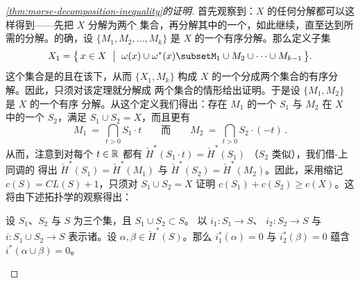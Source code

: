 \begin{proof}[\cref*{thm:morse-decomposition-inequality}的证明]
首先观察到：$X$ 的任何\trMorse{}分解都可以这样得到——先把 $X$ 分解为两个%
集合，再分解其中的一个，如此继续，直至达到所需的分解。的确，设%
$\{M_{1},M_{2},\ldots,M_{k}\}$ 是 $X$ 的一个有序\trMorse{}分解。那么定义子集
\[
X_{1}=\bigl\{\,x\in X\ \bigm|\ \omega(x)\cup\omega^{*}(x)\subset%
M_{1}\cup M_{2}\cup\cdots\cup M_{k-1}\,\bigr\}.
\]
这个集合是\trCompact{}的且在该\trFlow{}下\trInvariant，从而 $\{X_{1},M_{k}\}$%
构成 $X$ 的一个分成两个集合的有序\trMorse{}分解。因此，只须对该定理就分解成%
两个集合的情形给出证明。于是设 $\{M_{1},M_{2}\}$ 是 $X$ 的一个有序%
\trMorse{}分解。从这个定义我们得出：存在 $M_{1}$ 的一个\trCompact%
\trNeighborhood{} $S_{1}$ 与 $M_{2}$ 在 $X$ 中的一个\trCompact\trNeighborhood{}%
$S_{2}$，满足 $S_{1}\cup S_{2}=X$，而且更有
\[
M_{1}\ =\ \bigcap_{t>0}S_{1}\cdot t\qquad\text{而}\qquad M_{2}\ =\ %
\bigcap_{t>0}S_{2}\cdot(-t)\,.
\]
从而，注意到对每个 $t\in\mathbb{R}$ 都有 $\check{H}^{*}(S_{1}\cdot t)=\check{H}^{*}(S_{1})$%
（$S_{2}$ 类似），我们借\trAlexander-\trSpanier{}上同调的\trContinuity%
得出 $\check{H}^{*}(S_{1})=\check{H}^{*}(M_{1})$ 与%
$\check{H}^{*}(S_{2})=\check{H}^{*}(M_{2})$。因此，采用缩记%
$c(S)=CL(S)+1$，只须对 $S_{1}\cup S_{2}=X$ 证明%
$c(S_{1})+c(S_{2})\geq c(X)$。这将由下述拓扑学的观察得出：

\begin{lemma}\label{lem:cup-product-kernel}
设 $S_{1}$、$S_{2}$ 与 $S$ 为三个\trCompact{}集，且 $S_{1}\cup S_{2}\subset S$。%
以 $i_{1}:S_{1}\to S$、%
$i_{2}:S_{2}\to S$ 与 $i:S_{1}\cup S_{2}\to S$ 表示诸\trInclusionMapping。设%
$\alpha,\beta\in\check{H}^{*}(S)$。那么 $i_{1}^{*}(\alpha)=0$ 与%
$i_{2}^{*}(\beta)=0$ 蕴含 $i^{*}(\alpha\cup\beta)=0$。
\end{lemma}


\end{proof}
